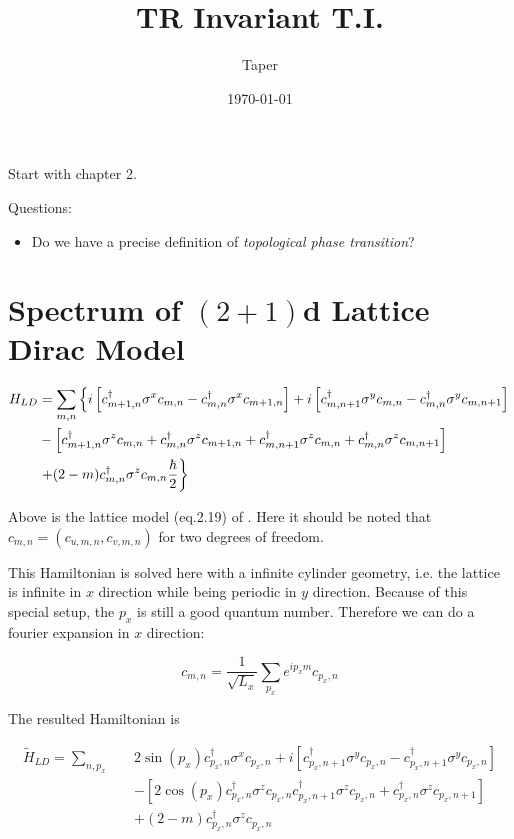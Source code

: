 \documentclass{article}
\title{TR Invariant T.I.}
\date{\today}
\author{Taper}
\begin{document}
\maketitle
{}
\tableofcontents
Start with chapter 2.

Questions:
\begin{itemize}
    \item Do we have a precise definition of \textit{topological phase
        transition}?
\end{itemize}

\section{Spectrum of \texorpdfstring{$(2+1)$}-d Lattice Dirac Model}
\label{sec:2+1d-LDirac Model}
\begin{align}
    H_{LD} &= \sum_{m,n}\left\{
        i \left[ c^\dagger_{m+1,n}\sigma^x c_{m,n}
            - c^\dagger_{m,n}\sigma^x c_{m+1,n}\right]
        + i \left[ c^\dagger_{m,n+1}\sigma^y c_{m,n}
            - c^\dagger_{m,n}\sigma^y c_{m,n+1} \right]
        \right.
        \nonumber\\
        &- \left[
            c^\dagger_{m+1,n}\sigma^z c_{m,n}
            + c^\dagger_{m,n}\sigma^z c_{m+1,n}
            + c^\dagger_{m,n+1}\sigma^z c_{m,n}
            + c^\dagger_{m,n}\sigma^z c_{m,n+1}
        \right]
        \nonumber\\
        & \left. + (2-m) c^\dagger_{m,n}\sigma^z c_{m,n}
        \vphantom{xx}\frac\hbar2
    \right\}
\end{align}

Above is the lattice model (eq.2.19) of \cite{Hughes2009}. Here it
should be noted that $c_{m,n}=(c_{u,m,n}, c_{v,m,n})$ for two degrees
of freedom. 

This Hamiltonian is solved here with a infinite cylinder geometry, i.e.
the lattice is infinite in $x$ direction while being periodic in $y$
direction. Because of this special setup, the $p_x$ is still a good
quantum number. Therefore we can do a fourier expansion in $x$
direction:

\begin{equation}
    c_{m,n} = \frac{1}{\sqrt{L_x}} \sum_{p_x} e^{ip_x m} c_{p_x,n}
\end{equation}

The resulted Hamiltonian is 

\begin{align}
    \tilde H_{LD} = \sum_{n,p_x}\quad &
    2\sin(p_x) c^\dagger_{p_x,n}\sigma^x c_{p_x,n}
    +i \left[ c^\dagger_{p_x,n+1}\sigma^y c_{p_x,n} - 
        c^\dagger_{p_x,n+1}\sigma^y c_{p_x,n}\right]
    \nonumber\\
    &- \left[ 2\cos(p_x) c^\dagger_{p_x,n}\sigma^z c_{p_x,n}
        c^\dagger_{p_x,n+1}\sigma^z c_{p_x,n}
        + c^\dagger_{p_x,n}\sigma^z c_{p_x,n+1}
    \right]
    \nonumber\\
    &+ (2-m) c^\dagger_{p_x,n}\sigma^z c_{p_x,n}
\end{align}
\end{document}
